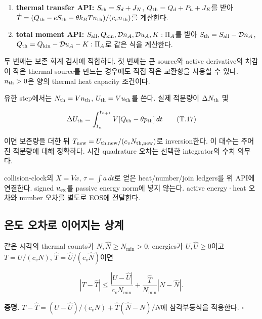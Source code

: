 \documentclass[11pt,a4paper]{article}
\providecommand{\tightlist}{\setlength{\itemsep}{2pt}\setlength{\parskip}{0pt}}
\begin{document}
\begin{enumerate}
\def\labelenumi{\arabic{enumi}.}
\tightlist
\item
  \textbf{thermal transfer API:} \(S_{\rm th}=S_d+J_N\), \(Q_{\rm th}=Q_d+P_h+J_E\)를 받아 \(\dot T=(Q_{\rm th}-eS_{\rm th}-\theta k_BTn_{\rm th})/(c_vn_{\rm th})\)를 계산한다.
\item
  \textbf{total moment API:} \(S_{\rm all},Q_{\rm kin},\mathcal Dn_A,\mathcal Du_A,K:\Pi_A\)를 받아 \(S_{\rm th}=S_{\rm all}-\mathcal Dn_A\), \(Q_{\rm th}=Q_{\rm kin}-\mathcal Du_A-K:\Pi_A\)로 같은 식을 계산한다.
\end{enumerate}

두 번째는 보존 회계 검사에 적합하다. 첫 번째는 큰 source와 active derivative의 차감이 작은 thermal source를 만드는 경우에도 직접 작은 교환항을 사용할 수 있다. \(n_{\rm th}>0\)은 양의 thermal heat capacity 조건이다.

유한 step에서는 \(N_{\rm th}=Vn_{\rm th}\), \(U_{\rm th}=Vu_{\rm th}\)를 쓴다. 실제 적분량이 \(\Delta N_{\rm th}\) 및

\[
\Delta U_{\rm th}
=\int_{t_n}^{t_{n+1}}V[Q_{\rm th}-\theta p_{\rm th}]\,dt
\tag{T.17}
\]

이면 보존량을 더한 뒤 \(T_{\rm new}=U_{\rm th,new}/(c_vN_{\rm th,new})\)로 inversion한다. 이 대수는 주어진 적분량에 대해 정확하다. 시간 quadrature 오차는 선택한 integrator의 수치 의무다.

collision-clock의 \(X=Vx\), \(\tau=\int a\,dt\)로 얻은 heat/number/join ledgers를 위 API에 연결한다. signed \(u_{\rm ex}\)를 passive energy norm에 넣지 않는다. active energy·heat 오차와 number 오차를 별도로 EOS에 전달한다.

\hypertarget{uxc628uxb3c4-uxc624uxcc28uxb85c-uxc774uxc5b4uxc9c0uxb294-uxc0c1uxacc4}{%
\subsection{온도 오차로 이어지는 상계}\label{uxc628uxb3c4-uxc624uxcc28uxb85c-uxc774uxc5b4uxc9c0uxb294-uxc0c1uxacc4}}

같은 시각의 thermal counts가 \(N,\widehat N\ge N_{\min}>0\), energies가 \(U,\widehat U\ge0\)이고 \(T=U/(c_vN)\), \(\widehat T=\widehat U/(c_v\widehat N)\)이면

\[
\boxed{|T-\widehat T|
\le\frac{|U-\widehat U|}{c_vN_{\min}}
+\frac{\widehat T}{N_{\min}}|N-\widehat N|.}
\tag{T.18}
\]

\textbf{증명.} \(T-\widehat T=(U-\widehat U)/(c_vN) +\widehat T(\widehat N-N)/N\)에 삼각부등식을 적용한다. \(\square\)
\end{document}
